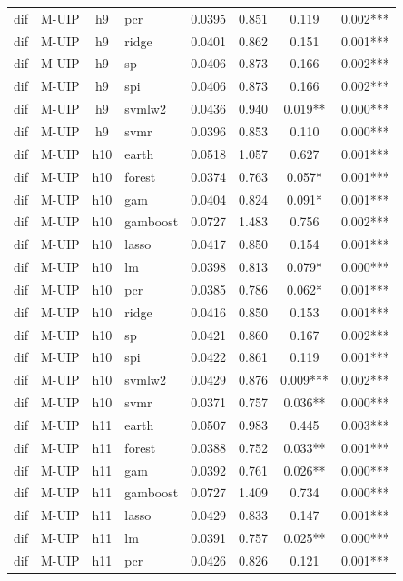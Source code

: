 \begin{ThreePartTable}
\begin{longtable}[t]{llclcccc}
dif & M-UIP & h9 & pcr & 0.0395 & 0.851 & 0.119 & 0.002***\\
dif & M-UIP & h9 & ridge & 0.0401 & 0.862 & 0.151 & 0.001***\\
dif & M-UIP & h9 & sp & 0.0406 & 0.873 & 0.166 & 0.002***\\
dif & M-UIP & h9 & spi & 0.0406 & 0.873 & 0.166 & 0.002***\\
dif & M-UIP & h9 & svmlw2 & 0.0436 & 0.940 & 0.019** & 0.000***\\
dif & M-UIP & h9 & svmr & 0.0396 & 0.853 & 0.110 & 0.000***\\
\addlinespace
dif & M-UIP & h10 & earth & 0.0518 & 1.057 & 0.627 & 0.001***\\
dif & M-UIP & h10 & forest & 0.0374 & 0.763 & 0.057* & 0.001***\\
dif & M-UIP & h10 & gam & 0.0404 & 0.824 & 0.091* & 0.001***\\
dif & M-UIP & h10 & gamboost & 0.0727 & 1.483 & 0.756 & 0.002***\\
dif & M-UIP & h10 & lasso & 0.0417 & 0.850 & 0.154 & 0.001***\\
dif & M-UIP & h10 & lm & 0.0398 & 0.813 & 0.079* & 0.000***\\
dif & M-UIP & h10 & pcr & 0.0385 & 0.786 & 0.062* & 0.001***\\
dif & M-UIP & h10 & ridge & 0.0416 & 0.850 & 0.153 & 0.001***\\
dif & M-UIP & h10 & sp & 0.0421 & 0.860 & 0.167 & 0.002***\\
dif & M-UIP & h10 & spi & 0.0422 & 0.861 & 0.119 & 0.001***\\
dif & M-UIP & h10 & svmlw2 & 0.0429 & 0.876 & 0.009*** & 0.002***\\
dif & M-UIP & h10 & svmr & 0.0371 & 0.757 & 0.036** & 0.000***\\
\addlinespace
dif & M-UIP & h11 & earth & 0.0507 & 0.983 & 0.445 & 0.003***\\
dif & M-UIP & h11 & forest & 0.0388 & 0.752 & 0.033** & 0.001***\\
dif & M-UIP & h11 & gam & 0.0392 & 0.761 & 0.026** & 0.000***\\
dif & M-UIP & h11 & gamboost & 0.0727 & 1.409 & 0.734 & 0.000***\\
dif & M-UIP & h11 & lasso & 0.0429 & 0.833 & 0.147 & 0.001***\\
dif & M-UIP & h11 & lm & 0.0391 & 0.757 & 0.025** & 0.000***\\
dif & M-UIP & h11 & pcr & 0.0426 & 0.826 & 0.121 & 0.001***\\

\end{longtable}
\end{ThreePartTable}
